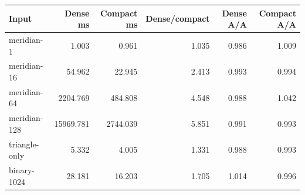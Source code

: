\begin{center}\small
\begin{tabular}{lrrrrr}
\toprule
Input & Dense ms & Compact ms & Dense/compact & Dense A/A & Compact A/A \\
\midrule
meridian-1 & 1.003 & 0.961 & 1.035 & 0.986 & 1.009 \\
meridian-16 & 54.962 & 22.945 & 2.413 & 0.993 & 0.994 \\
meridian-64 & 2204.769 & 484.808 & 4.548 & 0.988 & 1.042 \\
meridian-128 & 15969.781 & 2744.039 & 5.851 & 0.991 & 0.993 \\
triangle-only & 5.332 & 4.005 & 1.331 & 0.988 & 0.993 \\
binary-1024 & 28.181 & 16.203 & 1.705 & 1.014 & 0.996 \\
\bottomrule
\end{tabular}
\end{center}
